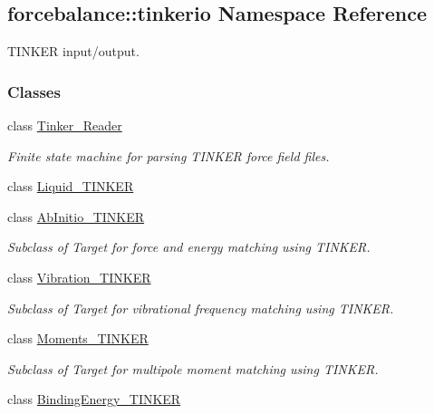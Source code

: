 \hypertarget{namespaceforcebalance_1_1tinkerio}{\subsection{forcebalance\-:\-:tinkerio \-Namespace \-Reference}
\label{namespaceforcebalance_1_1tinkerio}
}


\-T\-I\-N\-K\-E\-R input/output.  


\subsubsection*{\-Classes}
\begin{DoxyCompactItemize}
\item 
class \hyperlink{classforcebalance_1_1tinkerio_1_1Tinker__Reader}{\-Tinker\-\_\-\-Reader}
\begin{DoxyCompactList}\small\item\em \-Finite state machine for parsing \-T\-I\-N\-K\-E\-R force field files. \end{DoxyCompactList}\item 
class \hyperlink{classforcebalance_1_1tinkerio_1_1Liquid__TINKER}{\-Liquid\-\_\-\-T\-I\-N\-K\-E\-R}
\item 
class \hyperlink{classforcebalance_1_1tinkerio_1_1AbInitio__TINKER}{\-Ab\-Initio\-\_\-\-T\-I\-N\-K\-E\-R}
\begin{DoxyCompactList}\small\item\em \-Subclass of \-Target for force and energy matching using \-T\-I\-N\-K\-E\-R. \end{DoxyCompactList}\item 
class \hyperlink{classforcebalance_1_1tinkerio_1_1Vibration__TINKER}{\-Vibration\-\_\-\-T\-I\-N\-K\-E\-R}
\begin{DoxyCompactList}\small\item\em \-Subclass of \-Target for vibrational frequency matching using \-T\-I\-N\-K\-E\-R. \end{DoxyCompactList}\item 
class \hyperlink{classforcebalance_1_1tinkerio_1_1Moments__TINKER}{\-Moments\-\_\-\-T\-I\-N\-K\-E\-R}
\begin{DoxyCompactList}\small\item\em \-Subclass of \-Target for multipole moment matching using \-T\-I\-N\-K\-E\-R. \end{DoxyCompactList}\item 
class \hyperlink{classforcebalance_1_1tinkerio_1_1BindingEnergy__TINKER}{\-Binding\-Energy\-\_\-\-T\-I\-N\-K\-E\-R}

\end{DoxyCompactItemize}
